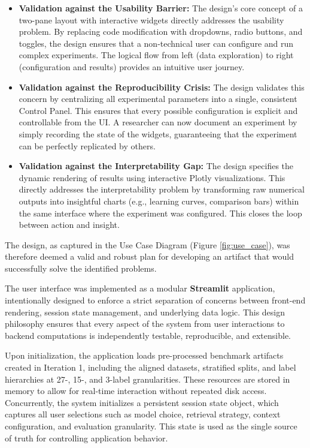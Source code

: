 \begin{itemize}
    \item \textbf{Validation against the Usability Barrier:} The design's core concept of a two-pane layout with interactive widgets directly addresses the usability problem. By replacing code modification with dropdowns, radio buttons, and toggles, the design ensures that a non-technical user can configure and run complex experiments. The logical flow from left (data exploration) to right (configuration and results) provides an intuitive user journey.
    
    \item \textbf{Validation against the Reproducibility Crisis:} The design validates this concern by centralizing all experimental parameters into a single, consistent Control Panel. This ensures that every possible configuration is explicit and controllable from the UI. A researcher can now document an experiment by simply recording the state of the widgets, guaranteeing that the experiment can be perfectly replicated by others.
    
    \item \textbf{Validation against the Interpretability Gap:} The design specifies the dynamic rendering of results using interactive Plotly visualizations. This directly addresses the interpretability problem by transforming raw numerical outputs into insightful charts (e.g., learning curves, comparison bars) within the same interface where the experiment was configured. This closes the loop between action and insight.
\end{itemize}

The design, as captured in the Use Case Diagram (Figure \ref{fig:use_case}), was therefore deemed a valid and robust plan for developing an artifact that would successfully solve the identified problems.

The user interface was implemented as a modular \textbf{Streamlit} application, intentionally designed to enforce a strict separation of concerns between front-end rendering, session state management, and underlying data logic. This design philosophy ensures that every aspect of the system from user interactions to backend computations is independently testable, reproducible, and extensible.

Upon initialization, the application loads pre-processed benchmark artifacts created in Iteration 1, including the aligned datasets, stratified splits, and label hierarchies at 27-, 15-, and 3-label granularities. These resources are stored in memory to allow for real-time interaction without repeated disk access. Concurrently, the system initializes a persistent session state object, which captures all user selections such as model choice, retrieval strategy, context configuration, and evaluation granularity. This state is used as the single source of truth for controlling application behavior.

